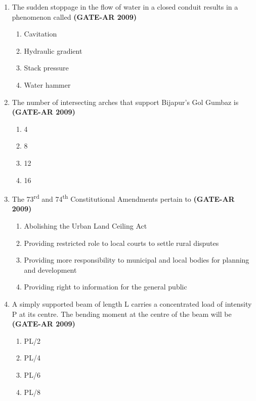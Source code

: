\documentclass[a4paper,10pt]{article}
\begin{document}
\begin{enumerate}
    \item The sudden stoppage in the flow of water in a closed conduit results in a phenomenon called \hfill \textbf{(GATE-AR 2009)}
    \begin{multicols}{2}
	\begin{enumerate}
        \item Cavitation
        \item Hydraulic gradient
        \item Stack pressure
        \item Water hammer
    \end{enumerate}
	\end{multicols}

    \item The number of intersecting arches that support Bijapur’s Gol Gumbaz is \hfill \textbf{(GATE-AR 2009)}
    \begin{multicols}{4}
	\begin{enumerate}
        \item 4
        \item 8
        \item 12
        \item 16
    \end{enumerate}
	\end{multicols}
    
    \item The 73\textsuperscript{rd} and 74\textsuperscript{th} Constitutional Amendments pertain to \hfill \textbf{(GATE-AR 2009)}
    \begin{enumerate}
        \item Abolishing the Urban Land Ceiling Act
        \item Providing restricted role to local courts to settle rural disputes
        \item Providing more responsibility to municipal and local bodies for planning and development
        \item Providing right to information for the general public
    \end{enumerate}
    
    \item A simply supported beam of length L carries a concentrated load of intensity P at its centre. The bending moment at the centre of the beam will be \hfill \textbf{(GATE-AR 2009)}
    \begin{multicols}{4}
	\begin{enumerate}
        \item PL/2
        \item PL/4
        \item PL/6
        \item PL/8
    \end{enumerate}
	\end{multicols}


\end{enumerate}
\end{document}

